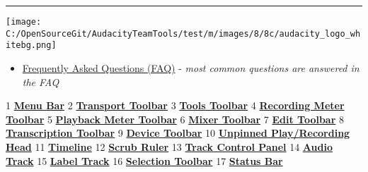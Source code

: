 
\par\vspace{1mm}\hrule
\par\texttt{[image: C:/OpenSourceGit/AudacityTeamTools/test/m/images/8/8c/audacity\_logo\_whitebg.png]}\par

\begin{itemize}
\item \hyperref[\foo{faq:}]{Frequently Asked Questions (FAQ)}
  -  \textit{most common questions are answered in the FAQ}
\end{itemize}

\par\vspace{6mm}

\label{index:reference}1\textbf{
\hyperref[\foo{menu:reference:}]{Menu Bar}
}2\textbf{
\hyperref[\foo{transport:toolbar:}]{Transport Toolbar}
}3\textbf{
\hyperref[\foo{tools:toolbar:}]{Tools Toolbar}
}4\textbf{
\hyperref[\foo{meter:toolbar:recording}]{Recording Meter Toolbar}
}5\textbf{
\hyperref[\foo{meter:toolbar:playback}]{Playback Meter Toolbar}
}6\textbf{
\hyperref[\foo{mixer:toolbar:}]{Mixer Toolbar}
}7\textbf{
\hyperref[\foo{edit:toolbar:}]{Edit Toolbar}
}8\textbf{
\hyperref[\foo{transcription:toolbar:}]{Transcription Toolbar}
}9\textbf{
\hyperref[\foo{device:toolbar:}]{Device Toolbar}
}10\textbf{
\hyperref[\foo{timeline:pinned}]{Unpinned Play/Recording Head}
}11\textbf{
\hyperref[\foo{timeline:}]{Timeline}
}12\textbf{
\hyperref[\foo{scrubbing:and:seeking:scrubbing}]{Scrub Ruler}
}13\textbf{
\hyperref[\foo{track:control:panel:and:vertical:scale:}]{Track Control Panel}
}14\textbf{
\hyperref[\foo{audio:tracks:}]{Audio Track}
}15\textbf{
\hyperref[\foo{label:tracks:}]{Label Track}
}16\textbf{
\hyperref[\foo{selection:toolbar:}]{Selection Toolbar}
}17\textbf{
\hyperref[\foo{status:bar:}]{Status Bar}
}


